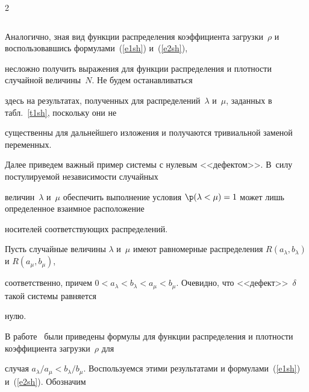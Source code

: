 \begin{multicols}{2}
\begin{table}
\begin{center}
\begin{tabular}{|c|c|c|}
\hline


\end{tabular}


\end{center}




\end{table}





Аналогично, зная вид функции распределения коэффициента загрузки~$\rho$ и воспользовавшись формулами~(\ref{e1sh}) и~(\ref{e2sh}),


несложно получить выражения для функции распределения и плотности случайной величины~$N$. Не будем останавливаться


здесь на результатах, полученных для распределений~$\lambda$ и~$\mu$, заданных в табл.~\ref{t1sh}, поскольку они не


существенны для дальнейшего изложения и получаются тривиальной заменой переменных.





Далее приведем важный пример системы с нулевым <<дефектом>>. В~силу постулируемой независимости случайных 


величин~$\lambda$ и~$\mu$ обеспечить выполнение условия $\p(\lambda<\mu)=1$ может лишь определенное взаимное расположение


носителей соответствующих распределений.





Пусть случайные величины $\lambda$ и~$\mu$ имеют равномерные распределения $R(a_\lambda,b_\lambda)$ и $R(a_\mu,b_\mu)$,


соответственно, причем $0<a_\lambda<b_\lambda<a_\mu<b_\mu$. Очевидно, что <<дефект>>~$\delta$ такой системы равняется


нулю.





В работе~\cite{KuSh07} были приведены формулы для функции распределения и плотности коэффициента загрузки~$\rho$ для


случая $a_\lambda/a_\mu<b_\lambda/b_\mu$. Воспользуемся этими результатами и формулами~(\ref{e1sh}) и~(\ref{e2sh}). Обозначим





\noindent



\end{multicols}
